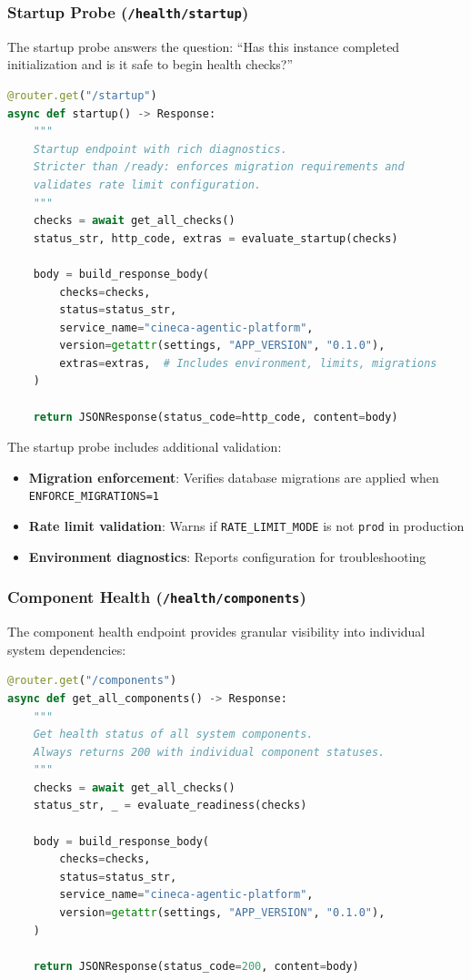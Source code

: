 \subsubsection{Startup Probe (\texttt{/health/startup})}

The startup probe answers the question: ``Has this instance completed initialization and is it safe to begin health checks?''

\begin{lstlisting}[language=Python, caption={Startup probe with extended diagnostics}]
@router.get("/startup")
async def startup() -> Response:
    """
    Startup endpoint with rich diagnostics.
    Stricter than /ready: enforces migration requirements and 
    validates rate limit configuration.
    """
    checks = await get_all_checks()
    status_str, http_code, extras = evaluate_startup(checks)
    
    body = build_response_body(
        checks=checks,
        status=status_str,
        service_name="cineca-agentic-platform",
        version=getattr(settings, "APP_VERSION", "0.1.0"),
        extras=extras,  # Includes environment, limits, migrations
    )
    
    return JSONResponse(status_code=http_code, content=body)
\end{lstlisting}

The startup probe includes additional validation:
\begin{itemize}
    \item \textbf{Migration enforcement}: Verifies database migrations are applied when \texttt{ENFORCE\_MIGRATIONS=1}
    \item \textbf{Rate limit validation}: Warns if \texttt{RATE\_LIMIT\_MODE} is not \texttt{prod} in production
    \item \textbf{Environment diagnostics}: Reports configuration for troubleshooting
\end{itemize}

\subsubsection{Component Health (\texttt{/health/components})}

The component health endpoint provides granular visibility into individual system dependencies:

\begin{lstlisting}[language=Python, caption={Component health endpoint}]
@router.get("/components")
async def get_all_components() -> Response:
    """
    Get health status of all system components.
    Always returns 200 with individual component statuses.
    """
    checks = await get_all_checks()
    status_str, _ = evaluate_readiness(checks)
    
    body = build_response_body(
        checks=checks,
        status=status_str,
        service_name="cineca-agentic-platform",
        version=getattr(settings, "APP_VERSION", "0.1.0"),
    )
    
    return JSONResponse(status_code=200, content=body)
\end{lstlisting}

